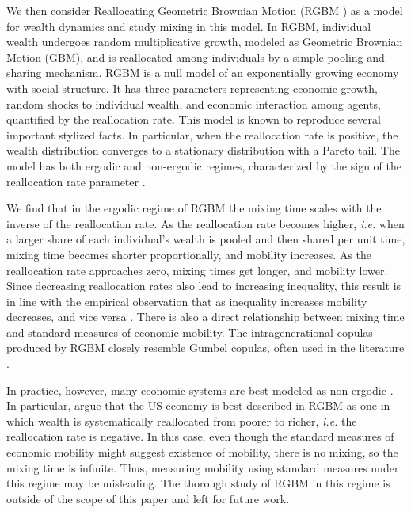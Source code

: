 \documentclass[11pt]{article}
\newcommand{\ie}{{\it i.e.}\xspace}
\numberwithin{equation}{section}
\begin{document}
We then consider Reallocating Geometric Brownian Motion (RGBM \citep{MarsiliMaslovZhang1998,LiuSerota2017,BermanPetersAdamou2019}) as a model for wealth dynamics and study mixing in this model. In RGBM, individual wealth undergoes random multiplicative growth, modeled as Geometric Brownian Motion (GBM), and is reallocated among individuals by a simple pooling and sharing mechanism. RGBM is a null model of an exponentially growing economy with social structure. It has three parameters representing economic growth, random shocks to individual wealth, and economic interaction among agents, quantified by the reallocation rate. This model is known to reproduce several important stylized facts. In particular, when the reallocation rate is positive, the wealth distribution converges to a stationary distribution with a Pareto tail. The model has both ergodic and non-ergodic regimes, characterized by the sign of the reallocation rate parameter \citep{BermanPetersAdamou2019}.

We find that in the ergodic regime of RGBM the mixing time scales with the inverse of the reallocation rate. As the reallocation rate becomes higher, \ie when a larger share of each individual's wealth is pooled and then shared per unit time, mixing time becomes shorter proportionally, and mobility increases. As the reallocation rate approaches zero, mixing times get longer, and mobility lower. Since decreasing reallocation rates also lead to increasing inequality, this result is in line with the empirical observation that as inequality increases mobility decreases, and vice versa \citep{corak2013}. There is also a direct relationship between mixing time and standard measures of economic mobility. The intragenerational copulas produced by RGBM closely resemble Gumbel copulas, often used in the literature \citep{Gumbel1958,TrivediZimmer2007}.

In practice, however, many economic systems are best modeled as non-ergodic \citep{Peters2019b}. In particular, \citet{BermanPetersAdamou2019} argue that the US economy is best described in RGBM as one in which wealth is systematically reallocated from poorer to richer, \ie the reallocation rate is negative. In this case, even though the standard measures of economic mobility might suggest existence of mobility, there is no mixing, so the mixing time is infinite. Thus, measuring mobility using standard measures under this regime may be misleading. The thorough study of RGBM in this regime is outside of the scope of this paper and left for future work.
\end{document}

